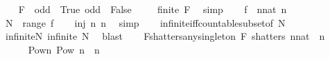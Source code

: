\begin{isabellebody}
\ \ \isamarkupfalse%
\ {\isacharquery}{\kern0pt}F\ {\isacharequal}{\kern0pt}\ {\isachardoublequoteopen}{\isacharbraceleft}{\kern0pt}odd\ {\isacharminus}{\kern0pt}{\isacharbackquote}{\kern0pt}\ {\isacharbraceleft}{\kern0pt}True{\isacharbraceright}{\kern0pt}{\isacharcomma}{\kern0pt}\ odd\ {\isacharminus}{\kern0pt}{\isacharbackquote}{\kern0pt}\ {\isacharbraceleft}{\kern0pt}False{\isacharbraceright}{\kern0pt}{\isacharbraceright}{\kern0pt}{\isachardoublequoteclose}\isanewline
\ \ \isamarkupfalse%
\ {}{\isacharcolon}{\kern0pt}\ {\isachardoublequoteopen}finite\ {\isacharquery}{\kern0pt}F{\isachardoublequoteclose}\ \isamarkupfalse%
\ simp\isanewline
\isanewline
\ \ \isamarkupfalse%
\ {\isacharquery}{\kern0pt}f\ {\isacharequal}{\kern0pt}\ {\isachardoublequoteopen}{\isasymlambda}n{\isacharcolon}{\kern0pt}{\isacharcolon}{\kern0pt}nat{\isachardot}{\kern0pt}\ {\isacharbraceleft}{\kern0pt}n{\isacharbraceright}{\kern0pt}{\isachardoublequoteclose}\ \isanewline
\ \ \isamarkupfalse%
\ {\isacharquery}{\kern0pt}N\ {\isacharequal}{\kern0pt}\ {\isachardoublequoteopen}range\ {\isacharquery}{\kern0pt}f{\isachardoublequoteclose}\isanewline
\ \ \isamarkupfalse%
\ {\isachardoublequoteopen}inj\ {\isacharparenleft}{\kern0pt}{\isasymlambda}n{\isachardot}{\kern0pt}\ {\isacharbraceleft}{\kern0pt}n{\isacharbraceright}{\kern0pt}{\isacharparenright}{\kern0pt}{\isachardoublequoteclose}\ \isamarkupfalse%
\ simp\isanewline
\ \ \isamarkupfalse%
\ infinite{\isacharunderscore}{\kern0pt}iff{\isacharunderscore}{\kern0pt}countable{\isacharunderscore}{\kern0pt}subset{\isacharbrackleft}{\kern0pt}of\ {\isacharquery}{\kern0pt}N{\isacharbrackright}{\kern0pt}\ \isamarkupfalse%
\ infinite{\isacharunderscore}{\kern0pt}N{\isacharcolon}{\kern0pt}\ {\isachardoublequoteopen}infinite\ {\isacharquery}{\kern0pt}N{\isachardoublequoteclose}\ \isamarkupfalse%
\ blast\isanewline
\ \ \isamarkupfalse%
\ F{\isacharunderscore}{\kern0pt}shatters{\isacharunderscore}{\kern0pt}any{\isacharunderscore}{\kern0pt}singleton{\isacharcolon}{\kern0pt}\ {\isachardoublequoteopen}{\isacharquery}{\kern0pt}F\ shatters\ {\isacharbraceleft}{\kern0pt}n{\isacharcolon}{\kern0pt}{\isacharcolon}{\kern0pt}nat{\isacharbraceright}{\kern0pt}{\isachardoublequoteclose}\ \ n\isanewline
\ \ \isamarkupfalse%
\ {\isacharminus}{\kern0pt}\isanewline
\ \ \ \ \isamarkupfalse%
\ Pow{\isacharunderscore}{\kern0pt}n{\isacharcolon}{\kern0pt}\ {\isachardoublequoteopen}Pow\ {\isacharbraceleft}{\kern0pt}n{\isacharbraceright}{\kern0pt}\ {\isacharequal}{\kern0pt}\ {\isacharbraceleft}{\kern0pt}{\isacharbraceleft}{\kern0pt}n{\isacharbraceright}{\kern0pt}{\isacharcomma}{\kern0pt}\ {\isacharbraceleft}{\kern0pt}{\isacharbraceright}{\kern0pt}{\isacharbraceright}{\kern0pt}{\isachardoublequoteclose}\ \isamarkupfalse%

\end{isabellebody}
